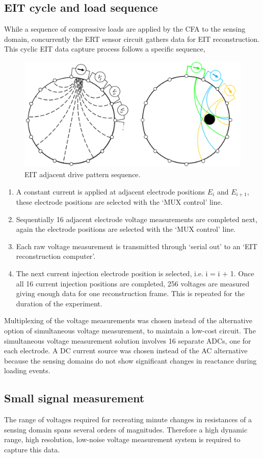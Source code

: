 \subsection{EIT cycle and load sequence}
While a sequence of compressive loads are applied by the CFA to the sensing domain, concurrently the ERT sensor circuit gathers data for EIT reconstruction. This cyclic EIT data capture process follows a specific sequence, 
\begin{figure}[H]
\centering
\includegraphics[width=0.7\linewidth]{Figures/eit_sequence.png}
\caption{EIT adjacent drive pattern sequence.}
\label{fig:ERT_PCB_CFA_archit}
\end{figure}
\begin{enumerate}
\item A constant current is applied at adjacent electrode positions $E_i$ and $E_{i+1}$, these electrode positions are selected with the `MUX control' line.
\item Sequentially 16 adjacent electrode voltage measurements are completed next, again the electrode positions are selected with the `MUX control' line.
\item Each raw voltage measurement is transmitted through `serial out' to an `EIT reconstruction computer'.
\item The next current injection electrode position is selected, i.e. i = i + 1. Once all 16 current injection positions are completed, 256 voltages are measured giving enough data for one reconstruction frame. This is repeated for the duration of the experiment.
\end{enumerate}
Multiplexing of the voltage measurements was chosen instead of the alternative option of simultaneous voltage measurement, to maintain a low-cost circuit. The simultaneous voltage measurement solution involves 16 separate ADCs, one for each electrode. A DC current source was chosen instead of the AC alternative because the sensing domains do not show significant changes in reactance during loading events.


\subsection{Small signal measurement}
The range of voltages required for recreating minute changes in resistances of a sensing domain spans several orders of magnitudes. Therefore a high dynamic range, high resolution, low-noise voltage measurement system is required to capture this data.

